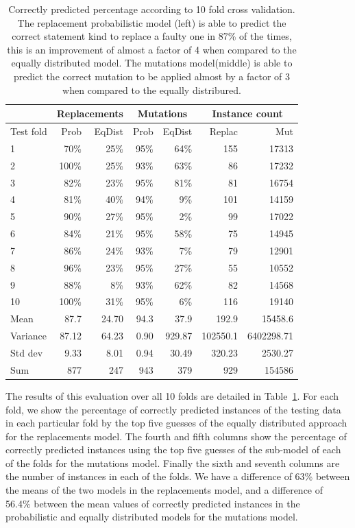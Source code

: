 \documentclass[conference]{IEEEtran}
\begin{document}
\begin{table}[ht]
\begin{tabular}{l|rr|rr|rr}
   &\multicolumn{2}{c|}{Replacements} &\multicolumn{2}{c|}{Mutations}&\multicolumn{2}{c}{Instance count} \\
   	\hline
Test fold	&Prob&	EqDist&Prob&	EqDist & Replac  & Mut\\
	\hline
1	&70\%&	25\% &  95\% & 64\% & 155 &17313 \\
2	&100\%&	25\%  & 93\% & 63\% & 86 & 17232 \\
3	&82\%	&23\% & 95\% & 81\% & 81 & 16754\\
4	&81\%	&40\%  & 94\% & 9\% & 101 & 14159 \\
5	&90\%	&27\%  & 95\% & 2\%& 99 & 17022 \\
6	&84\%	&21\%  & 95\%& 58\%& 75 & 14945 \\
7	&86\%	&24\%  & 93\%& 7\%& 79 & 12901 \\
8	&96\%	&23\%  & 95\%& 27\%& 55 & 10552 \\
9	&88\%	&8\%  & 93\%& 62\%& 82 & 14568\\
10	&100\%	&31\%  & 95\% & 6\%& 116 & 19140\\
	\hline
Mean	&87.7	&24.70  & 94.3 & 37.9 & 192.9 & 15458.6 \\
	\hline
Variance	&87.12&	64.23  & 0.90 & 929.87 & 102550.1 & 6402298.71 \\
	\hline
Std dev	&9.33&	8.01  & 0.94 & 30.49 & 320.23 & 2530.27 \\
	\hline
Sum& 877 & 247 & 943 & 379 & 929 &  154586\\


\hline
\end{tabular}
\center
  \caption{Correctly predicted percentage according to 10 fold cross
    validation. The replacement probabilistic model (left) is able to predict
    the correct statement kind to replace a faulty one in 87\% of the times,
    this is an improvement of almost a factor of 4 when compared to the equally
    distributed model. The mutations model(middle) is able to predict the
    correct mutation to be applied almost by a factor of 3 when compared to the
    equally distribured.} 
  \label{tab:results10fcv}
\end{table} 


The results of this evaluation over all 10 folds are detailed in
Table~\ref{tab:results10fcv}. For each fold, we show the percentage of correctly 
predicted instances of the testing data in each particular fold by the top five
guesses of the equally distributed approach for the replacements model. The
fourth and fifth columns show the percentage of correctly predicted
instances using the top five  
guesses of the sub-model of each of the folds for the mutations model. Finally the sixth and seventh columns are the number of instances in each of the folds. We have a difference of 63\% between the means of the two models in the replacements model, and a difference of 56.4\% between the mean values of correctly predicted instances in the probabilistic and equally distributed models for the mutations model.
\end{document}
